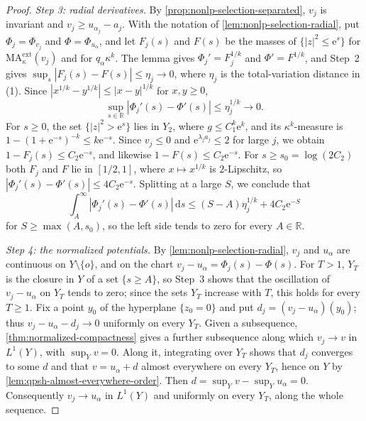 \begin{proof}
\emph{Step 3: radial derivatives.} By \cref{prop:nonlp-selection-separated}, $v_j$ is invariant and $v_j\geq u_{\alpha_j}-a_j$. With the notation of \cref{lem:nonlp-selection-radial}, put $\Phi_j=\Phi_{v_j}$ and $\Phi=\Phi_{u_\alpha}$, and let $F_j(s)$ and $F(s)$ be the masses of $\{|z|^2\leq\mathrm{e}^s\}$ for $\mathrm{MA}^{\mathrm{ext}}_\kappa(v_j)$ and for $q_\alpha\kappa^k$. The lemma gives $\Phi_j'=F_j^{1/k}$ and $\Phi'=F^{1/k}$, and Step~2 gives $\sup_s|F_j(s)-F(s)|\leq\eta_j\to0$, where $\eta_j$ is the total-variation distance in (1). Since $|x^{1/k}-y^{1/k}|\leq|x-y|^{1/k}$ for $x,y\geq0$,
\[
 \sup_{s\in\mathbb R}|\Phi_j'(s)-\Phi'(s)|\leq\eta_j^{1/k}\longrightarrow0.
\]
For $s\geq0$, the set $\{|z|^2>\mathrm{e}^s\}$ lies in $Y_2$, where $g\leq C_1^k\mathrm{e}^k$, and its $\kappa^k$-measure is $1-(1+\mathrm{e}^{-s})^{-k}\leq k\mathrm{e}^{-s}$. Since $v_j\leq0$ and $\mathrm{e}^{\lambda_ja_j}\leq2$ for large $j$, we obtain $1-F_j(s)\leq C_2\mathrm{e}^{-s}$, and likewise $1-F(s)\leq C_2\mathrm{e}^{-s}$. For $s\geq s_0=\log(2C_2)$ both $F_j$ and $F$ lie in $[1/2,1]$, where $x\mapsto x^{1/k}$ is $2$-Lipschitz, so $|\Phi_j'(s)-\Phi'(s)|\leq4C_2\mathrm{e}^{-s}$. Splitting at a large $S$, we conclude that
\[
 \int_A^\infty|\Phi_j'(s)-\Phi'(s)|\,\mathrm{d}s\leq(S-A)\eta_j^{1/k}+4C_2\mathrm{e}^{-S}
\]
for $S\geq\max(A,s_0)$, so the left side tends to zero for every $A\in\mathbb R$.

\emph{Step 4: the normalized potentials.} By \cref{lem:nonlp-selection-radial}, $v_j$ and $u_\alpha$ are continuous on $Y\setminus\{o\}$, and on the chart $v_j-u_\alpha=\Phi_j(s)-\Phi(s)$. For $T>1$, $Y_T$ is the closure in $Y$ of a set $\{s\geq A\}$, so Step~3 shows that the oscillation of $v_j-u_\alpha$ on $Y_T$ tends to zero; since the sets $Y_T$ increase with $T$, this holds for every $T\geq1$. Fix a point $y_0$ of the hyperplane $\{z_0=0\}$ and put $d_j=(v_j-u_\alpha)(y_0)$; thus $v_j-u_\alpha-d_j\to0$ uniformly on every $Y_T$. Given a subsequence, \cref{thm:normalized-compactness} gives a further subsequence along which $v_j\to v$ in $L^1(Y)$, with $\sup_Yv=0$. Along it, integrating over $Y_T$ shows that $d_j$ converges to some $d$ and that $v=u_\alpha+d$ almost everywhere on every $Y_T$, hence on $Y$ by \cref{lem:qpsh-almost-everywhere-order}. Then $d=\sup_Yv-\sup_Yu_\alpha=0$. Consequently $v_j\to u_\alpha$ in $L^1(Y)$ and uniformly on every $Y_T$, along the whole sequence.


\end{proof}
